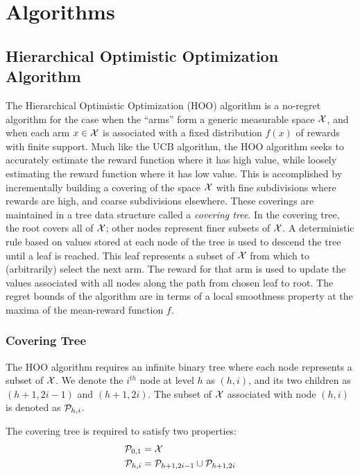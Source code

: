 \section{Algorithms}
\subsection{Hierarchical Optimistic Optimization Algorithm}

The Hierarchical Optimistic Optimization (HOO) algorithm is a
no-regret algorithm for the case when the ``arms'' form a generic
measurable space ${\mathcal{X}}$, and when each arm $x \in {\mathcal{X}}$ is associated
with a fixed distribution $f(x)$ of rewards with finite support. Much
like the UCB algorithm, the HOO algorithm seeks to accurately estimate
the reward function where it has high value, while loosely estimating
the reward function where it has low value. This is accomplished by
incrementally building a covering of the space ${\mathcal{X}}$ with fine
subdivisions where rewards are high, and coarse subdivisions
elsewhere. These coverings are maintained in a tree data structure
called a \emph{covering tree}. In the covering tree, the root covers
all of ${\mathcal{X}}$; other nodes represent finer subsets of ${\mathcal{X}}$. A
deterministic rule based on values stored at each node of the tree is
used to descend the tree until a leaf is reached. This leaf represents
a subset of ${\mathcal{X}}$ from which to (arbitrarily) select the next arm. The
reward for that arm is used to update the values associated with all
nodes along the path from chosen leaf to root. The regret bounds of
the algorithm are in terms of a local smoothness property at the
maxima of the mean-reward function $f$.

\subsubsection{Covering Tree}\label{sss:coverTree}
The HOO algorithm requires an infinite binary tree where each node
represents a subset of ${\mathcal{X}}$. We denote the $i^{th}$ node at level
$h$ as $(h,i)$, and its two children as $(h+1, 2i-1)$ and $(h+1,
2i)$. The subset of ${\mathcal{X}}$ associated with node $(h,i)$ is denoted
as ${\mathcal{P}}_{h,i}$.

The covering tree is required to satisfy two properties:
\begin{align*}
  {\mathcal{P}}_{0,1} &= {\mathcal{X}}\\
  {\mathcal{P}}_{h,i} &= {\mathcal{P}}_{h+1,2i-1} \cup {\mathcal{P}}_{h+1,2i}
\end{align*}

